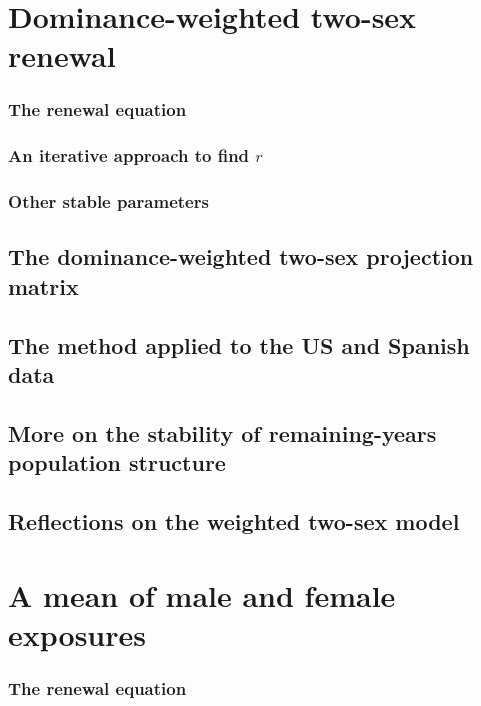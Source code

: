   \chapter{Dominance-weighted two-sex renewal}
    
    \subsection{The renewal equation}
      
    \subsection{An iterative approach to find $r$}
      
    \subsection{Other stable parameters}
      
  \section{The dominance-weighted two-sex projection matrix}
      
  \section{The method applied to the US and Spanish data}
      
  \section{More on the stability of remaining-years population structure}
    
  \section{Reflections on the weighted two-sex model}
      
  
  \chapter{A mean of male and female exposures}
    
      \subsection{The renewal equation}
         
